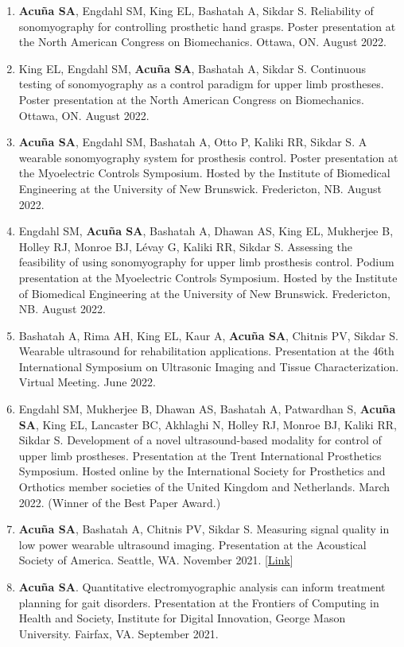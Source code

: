 \documentclass[letterpaper, 10pt]{article}
\begin{document}
\begin{enumerate}
    \item \textbf{Acuña SA}, Engdahl SM, King EL, Bashatah A, Sikdar S. Reliability of sonomyography for controlling prosthetic hand grasps. Poster presentation at the North American Congress on Biomechanics. Ottawa, ON. August 2022.
    \item King EL, Engdahl SM, \textbf{Acuña SA}, Bashatah A, Sikdar S. Continuous testing of sonomyography as a control paradigm for upper limb prostheses. Poster presentation at the North American Congress on Biomechanics. Ottawa, ON. August 2022.
    \item \textbf{Acuña SA}, Engdahl SM, Bashatah A, Otto P, Kaliki RR, Sikdar S. A wearable sonomyography system for prosthesis control. Poster presentation at the Myoelectric Controls Symposium. Hosted by the Institute of Biomedical Engineering at the University of New Brunswick. Fredericton, NB. August 2022.
    \item Engdahl SM, \textbf{Acuña SA}, Bashatah A, Dhawan AS, King EL, Mukherjee B, Holley RJ, Monroe BJ, Lévay G, Kaliki RR, Sikdar S. Assessing the feasibility of using sonomyography for upper limb prosthesis control. Podium presentation at the Myoelectric Controls Symposium. Hosted by the Institute of Biomedical Engineering at the University of New Brunswick. Fredericton, NB. August 2022.
    \item Bashatah A, Rima AH, King EL, Kaur A, \textbf{Acuña SA}, Chitnis PV, Sikdar S. Wearable ultrasound for rehabilitation applications. Presentation at the 46th International Symposium on Ultrasonic Imaging and Tissue Characterization. Virtual Meeting. June 2022.
    \item Engdahl SM, Mukherjee B, Dhawan AS, Bashatah A, Patwardhan S, \textbf{Acuña SA}, King EL, Lancaster BC, Akhlaghi N, Holley RJ, Monroe BJ, Kaliki RR, Sikdar S. Development of a novel ultrasound-based modality for control of upper limb prostheses. Presentation at the Trent International Prosthetics Symposium. Hosted online by the International Society for Prosthetics and Orthotics member societies of the United Kingdom and Netherlands. March 2022. (Winner of the Best Paper Award.)
    \item \textbf{Acuña SA}, Bashatah A, Chitnis PV, Sikdar S. Measuring signal quality in low power wearable ultrasound imaging. Presentation at the Acoustical Society of America. Seattle, WA. November 2021. [\href{https://asa.scitation.org/doi/10.1121/10.0007727}{Link}]
    \item \textbf{Acuña SA}. Quantitative electromyographic analysis can inform treatment planning for gait disorders. Presentation at the Frontiers of Computing in Health and Society, Institute for Digital Innovation, George Mason University. Fairfax, VA. September 2021.

\end{enumerate}
\end{document}
